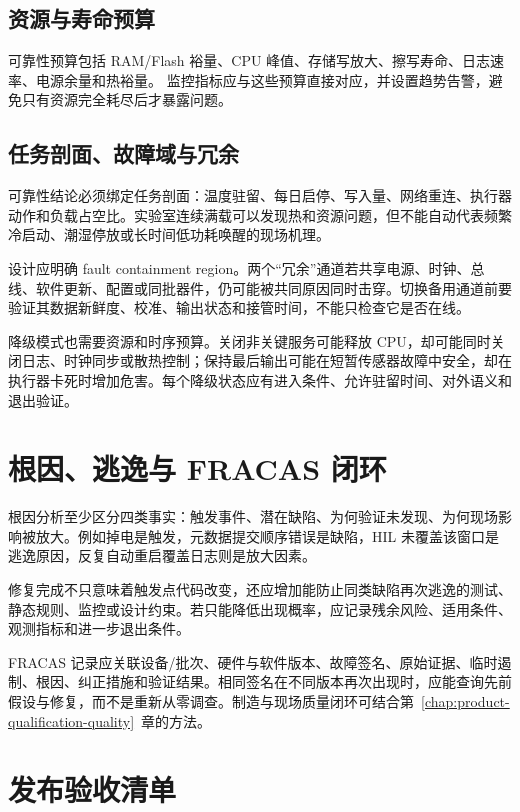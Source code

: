 \subsection{资源与寿命预算}

可靠性预算包括 RAM/Flash 裕量、CPU 峰值、存储写放大、擦写寿命、日志速率、电源余量和热裕量。
监控指标应与这些预算直接对应，并设置趋势告警，避免只有资源完全耗尽后才暴露问题。

\subsection{任务剖面、故障域与冗余}

可靠性结论必须绑定任务剖面：温度驻留、每日启停、写入量、网络重连、执行器动作和负载占空比。实验室连续满载可以发现热和资源问题，但不能自动代表频繁冷启动、潮湿停放或长时间低功耗唤醒的现场机理。

设计应明确 fault containment region。两个“冗余”通道若共享电源、时钟、总线、软件更新、配置或同批器件，仍可能被共同原因同时击穿。切换备用通道前要验证其数据新鲜度、校准、输出状态和接管时间，不能只检查它是否在线。

降级模式也需要资源和时序预算。关闭非关键服务可能释放 CPU，却可能同时关闭日志、时钟同步或散热控制；保持最后输出可能在短暂传感器故障中安全，却在执行器卡死时增加危害。每个降级状态应有进入条件、允许驻留时间、对外语义和退出验证。

\section{根因、逃逸与 FRACAS 闭环}

根因分析至少区分四类事实：触发事件、潜在缺陷、为何验证未发现、为何现场影响被放大。例如掉电是触发，元数据提交顺序错误是缺陷，HIL 未覆盖该窗口是逃逸原因，反复自动重启覆盖日志则是放大因素。

修复完成不只意味着触发点代码改变，还应增加能防止同类缺陷再次逃逸的测试、静态规则、监控或设计约束。若只能降低出现概率，应记录残余风险、适用条件、观测指标和进一步退出条件。

FRACAS 记录应关联设备/批次、硬件与软件版本、故障签名、原始证据、临时遏制、根因、纠正措施和验证结果。相同签名在不同版本再次出现时，应能查询先前假设与修复，而不是重新从零调查。制造与现场质量闭环可结合第~\ref{chap:product-qualification-quality}~章的方法。

\section{发布验收清单}


